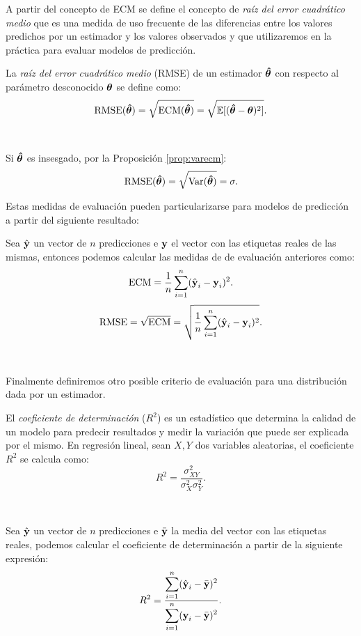 \documentclass[oneside,openright,titlepage,numbers=noenddot,openany,headinclude,footinclude=true,
cleardoublepage=empty,abstractoff,BCOR=5mm,paper=a4,fontsize=12pt,main=spanish]{scrreprt}
\begin{document}
A partir del concepto de ECM se define el concepto de \textit{raíz del error cuadrático medio} que es una medida de uso frecuente de las diferencias entre los valores predichos por un estimador y los valores observados y que utilizaremos en la práctica para evaluar modelos de predicción.\\

\begin{definition}
La \textit{raíz del error cuadrático medio} (RMSE) de un estimador $\bm{\hat{\theta}}$ con respecto al parámetro desconocido $\bm{\theta}$ se define como: $$\text{RMSE}(\bm{\hat{\theta}})=\sqrt{\text{ECM}(\bm{\hat{\theta}})}=\sqrt{\mathbb{E}[(\bm{\hat{\theta}}-\bm{\theta})^2]}.$$
\end{definition}\

\begin{remark}
Si $\bm{\hat{\theta}}$ es insesgado, por la Proposición \ref{prop:varecm}: $$\text{RMSE}(\bm{\hat{\theta}})=\sqrt{\text{Var}(\bm{\hat{\theta}})}=\sigma.$$
\end{remark}

Estas medidas de evaluación pueden particularizarse para modelos de predicción a partir del siguiente resultado:\\

\begin{proposition}
Sea $\hat{\textbf{y}}$ un vector de $n$ predicciones e $\textbf{y}$ el vector con las etiquetas reales de las mismas, entonces podemos calcular las medidas de de evaluación anteriores como: $$\text{ECM}=\frac{1}{n}\sum_{i=1}^n (\hat{\textbf{y}}_i-\textbf{y}_i)^2.$$ $$\text{RMSE}=\sqrt{\text{ECM}}=\sqrt{\frac{1}{n}\sum_{i=1}^n (\hat{\textbf{y}}_i-\textbf{y}_i)^2}.$$
\end{proposition}\

Finalmente definiremos otro posible criterio de evaluación para una distribución dada por un estimador.\\

\begin{definition}
El \textit{coeficiente de determinación} ($R^2$) es un estadístico que determina la calidad de un modelo para predecir resultados y medir la variación que puede ser explicada por el mismo. En regresión lineal, sean $X,Y$ dos variables aleatorias, el coeficiente $R^2$ se calcula como: $$R^2=\frac{\sigma^2_{XY}}{\sigma^2_X \sigma^2_Y}.$$
\end{definition}\

\begin{proposition}
Sea $\hat{\textbf{y}}$ un vector de $n$ predicciones e $\bar{\textbf{y}}$ la media del vector con las etiquetas reales, podemos calcular el coeficiente de determinación a partir de la siguiente expresión: $$R^2=\frac{\displaystyle \sum_{i=1}^n (\hat{\textbf{y}}_i-\bar{\textbf{y}})^2}{\displaystyle \sum_{i=1}^n (\textbf{y}_i-\bar{\textbf{y}})^2}.$$
\end{proposition}
\end{document}
